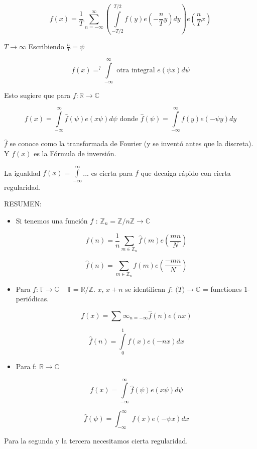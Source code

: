 $$f(x) = \frac{1}{T} \sum_{n = -\infty}^{\infty} \left(  \int\limits^{T/2}_{-T/2} f(y) e(-\frac{n}{T}y) dy \right) e (\frac{n}{T}x)$$

$T \rightarrow \infty$ Escribiendo $\frac{n}{T} = \psi$

$$ f(x) =^{?} \int\limits^{\infty}_{-\infty} \text{ otra integral } e(\psi x) d\psi $$

Esto sugiere que para $f: \mathbb{R} \rightarrow \mathbb{C}$

$$f(x) = \int\limits^{\infty}_{-\infty} \hat{f}(\psi) e (x \psi) d \psi \text{ donde } \hat{f}(\psi) = \int\limits^{\infty}_{-\infty} f(y) e(-\psi y)dy$$

$\hat{f}$ se conoce como la transformada de Fourier (y se inventó antes que la discreta). Y $f(x)$ es la Fórmula de inversión.

La igualdad $f(x) = \int\limits^{\infty}_{-\infty} $... es cierta para $f$ que decaiga rápido con cierta regularidad.


RESUMEN:

\begin{itemize}

\item Si tenemos una función $f$ : $\mathbb{Z}_{n} = \mathbb{Z} / n \mathbb{Z} \rightarrow \mathbb{C}$

$$ f(n) = \frac{1}{n} \sum_{m \in \mathbb{Z}_{n}} \hat{f}(m) e \left( \frac{mn}{N} \right) $$

$$ \hat{f}(n) = \sum_{m \in \mathbb{Z}_{n}} f(m) e \left( \frac{-mn}{N} \right)$$

\item Para $f: \mathbb{T} \rightarrow \mathbb{C} \;\;\;\; \mathbb{T} = \mathbb{R}/\mathbb{Z}$.  $x$, $x+n$ se identifican $f$: $\mathbb(T) \rightarrow \mathbb{C}$ = functiones 1-periódicas.

$$ f(x) = \sum{\infty}_{n = -\infty} \hat{f} (n) e (nx) $$

$$ \hat{f} (n) = \int\limits_{0}^{1} f(x) e (-nx) dx $$

\item Para f: $\mathbb{R} \rightarrow \mathbb{C}$

$$ f(x) = \int\limits^{\infty}_{-\infty} \hat{f}(\psi) e(x \psi) d\psi $$

$$ \hat{f}(\psi) = \int^{\infty}_{-\infty} f(x) e(-\psi x)dx$$

\end{itemize}

\begin{obs}

	Para la segunda y la tercera necesitamos cierta regularidad.

\end{obs}


